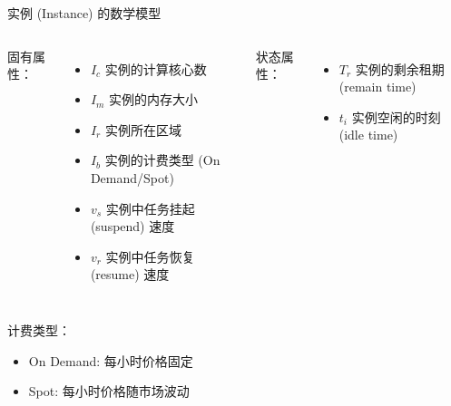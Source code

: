 \begin{frame}{实例 (Instance) 的数学模型}

    \begin{columns}


        固有属性：

        \begin{itemize}
            \item $I_c$ 实例的计算核心数
            \item $I_m$ 实例的内存大小
            \item $I_r$ 实例所在区域
            \item $I_b$ 实例的计费类型 (On Demand/Spot)
            \item $v_s$ 实例中任务挂起 (suspend) 速度
            \item $v_r$ 实例中任务恢复 (resume) 速度
        \end{itemize}


        状态属性：

        \begin{itemize}
            \item $T_r$ 实例的剩余租期 (remain time)
            \item $t_i$ 实例空闲的时刻 (idle time)
        \end{itemize}

    \end{columns}

    \vspace{1em}

    计费类型：

    \begin{itemize}
        \item On Demand: 每小时价格固定
        \item Spot: 每小时价格随市场波动
    \end{itemize}

\end{frame}
